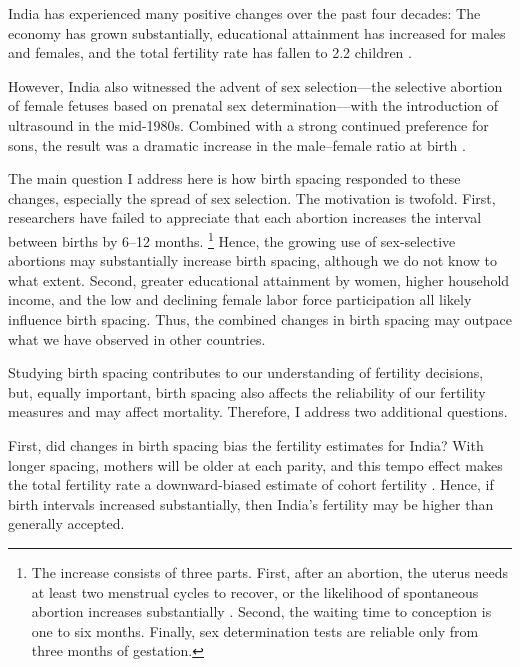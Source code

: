 \documentclass[12pt,letterpaper]{article}
\begin{document}
India has experienced many positive changes over the past four decades:
The economy has grown substantially,
educational attainment has increased for males and females,
and the total fertility rate has fallen to 2.2 children
\citep{Bosworth2008,Dharmalingam2014,
International-Institute-for-Population-Sciences-IIPS2017}.

However, India also witnessed the advent of sex selection---the selective abortion of 
female fetuses based on prenatal sex determination---with the introduction of ultrasound 
in the mid-1980s.
Combined with a strong continued preference for sons, the result was a dramatic increase 
in the male--female ratio at birth
\citep{das_gupta97,Arnold2002,retherford03b,Guilmoto2012,Portner2015b,Jayachandran2017}.


The main question I address here is how birth spacing responded to these changes, 
especially the spread of sex selection. 
The motivation is twofold.
First, researchers have failed to appreciate that each abortion increases the
interval between births by 6--12 months.%
\footnote{
The increase consists of three parts. 
First, after an abortion, the uterus needs at least two menstrual cycles to recover, 
or the likelihood of spontaneous abortion increases substantially \citep{zhou00b}. 
Second, the waiting time to conception is one to six months. 
Finally, sex determination tests are reliable only from three months of gestation. 
}
Hence, the growing use of sex-selective abortions may substantially increase birth spacing, 
although we do not know to what extent. 
Second, greater educational attainment by women, higher household income, and the low and 
declining female labor force participation all likely influence birth spacing. 
Thus, the combined changes in birth spacing may outpace what we have observed in 
other countries.

Studying birth spacing contributes to our understanding of fertility decisions, but, equally 
important, birth spacing also affects the reliability of our fertility measures and may 
affect mortality. 
Therefore, I address two additional questions. 

First, did changes in birth spacing bias the fertility estimates for India? 
With longer spacing, mothers will be older at each parity, and this tempo effect makes the 
total fertility rate a downward-biased estimate of cohort fertility
\citep{Hotz1997,Bongaarts1999,Ni-Bhrolchain2011}. 
Hence, if birth intervals increased substantially, then India's fertility may be higher 
than generally accepted.
\end{document}
